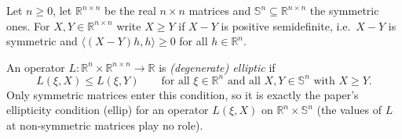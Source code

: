 \begin{definition}
Let $n\ge0$, let $\mathbb R^{n\times n}$ be the real $n\times n$ matrices and $\mathbb S^n\subseteq\mathbb R^{n\times n}$ the symmetric ones. For $X,Y\in\mathbb R^{n\times n}$ write $X\ge Y$ if $X-Y$ is positive semidefinite, i.e.\ $X-Y$ is symmetric and $\langle (X-Y)h,h\rangle\ge0$ for all $h\in\mathbb R^n$.

An operator $L:\mathbb R^n\times\mathbb R^{n\times n}\to\mathbb R$ is \emph{(degenerate) elliptic} if
\[
L(\xi,X)\le L(\xi,Y)\qquad\text{for all }\xi\in\mathbb R^n\text{ and all }X,Y\in\mathbb S^n\text{ with }X\ge Y .
\]
Only symmetric matrices enter this condition, so it is exactly the paper's ellipticity condition (ellip) for an operator $L(\xi,X)$ on $\mathbb R^n\times\mathbb S^n$ (the values of $L$ at non-symmetric matrices play no role).
\end{definition}
